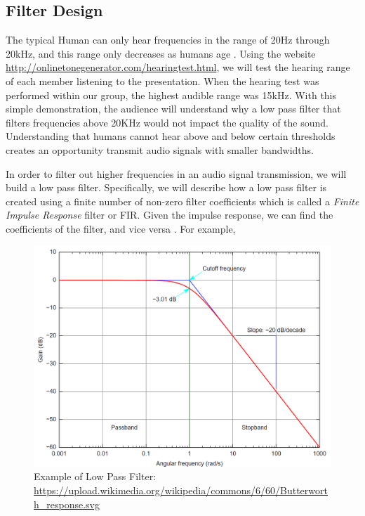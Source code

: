 \subsection{Filter Design}

The typical Human can only hear frequencies in the range of 20Hz through 20kHz, and this range only decreases as humans age  \cite{human:rg}.  Using the website \url{http://onlinetonegenerator.com/hearingtest.html}, we will test the hearing range of each member listening to the presentation.  When the hearing test was performed within our group, the highest audible range was 15kHz.  With this simple demonstration, the audience will understand why a low pass filter that filters frequencies above 20KHz would not impact the quality of the sound.  Understanding that humans cannot hear above and below certain thresholds creates an opportunity transmit audio signals with smaller bandwidths.  

In order to filter out higher frequencies in an audio signal transmission, we will build a low pass filter.  Specifically, we will describe how a low pass filter is created using a finite number of non-zero filter coefficients which is called a \textit{Finite Impulse Response} filter or FIR.  Given the impulse response, we can find the coefficients of the filter, and vice versa \cite{notes:class}.  For example, 

\begin{figure}[h!]
	\centering
	\includegraphics[scale = .5]{low_pass.png} %
	\caption{Example of Low Pass Filter: \url{https://upload.wikimedia.org/wikipedia/commons/6/60/Butterworth_response.svg}}
\end{figure}    
 
